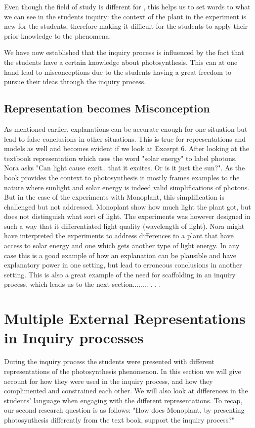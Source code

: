 Even though the field of study is different for \citeauthor{klahr1993heuristics}, this helps us to set words to what we can see in the students inquiry: the context of the plant in the experiment is new for the students, therefore making it difficult for the students to apply their prior knowledge to the phenomena. 

We have now established that the inquiry process is influenced by the fact that the students have a certain knowledge about photosynthesis. This can at one hand lead to misconceptions due to the students having a great freedom to pursue their ideas through the inquiry process. 


\subsection{Representation becomes Misconception}
As mentioned earlier, explanations can be accurate enough for one situation but lead to false conclusions in other situations. \citep{smith1994misconceptions} This is true for representations and models as well and becomes evident if we look at Excerpt 6. After looking at the textbook representation which uses the word "solar energy" to label photons, Nora asks "Can light cause excit.. that it excites. Or is it just the sun?". As the book provides the context to photosynthesis it mostly frames examples to the nature where sunlight and solar energy is indeed valid simplifications of photons. But in the case of the experiments with Monoplant, this simplification is challenged but not addressed. Monoplant show how much light the plant got, but does not distinguish what sort of light. The experiments was however designed in such a way that it differentiated light quality (wavelength of light). Nora might have interpreted the experiments to address differences to a plant that have access to solar energy and one which gets another type of light energy. In any case this is a good example of how an explanation can be plausible and have explanatory power in one setting, but lead to erroneous conclusions in another setting. This is also a great example of the need for scaffolding in an inquiry process, which leads us to the next section........ . . . 




\section{Multiple External Representations in Inquiry processes}
During the inquiry process the students were presented with different representations of the photosynthesis phenomenon. In this section we will give account for how they were used in the inquiry process, and how they complimented and constrained each other. We will also look at differences in the students' language when engaging with the different representations. To recap, our second research question is as follows: "How does Monoplant, by presenting photosynthesis differently from the text book, support the inquiry process?"

